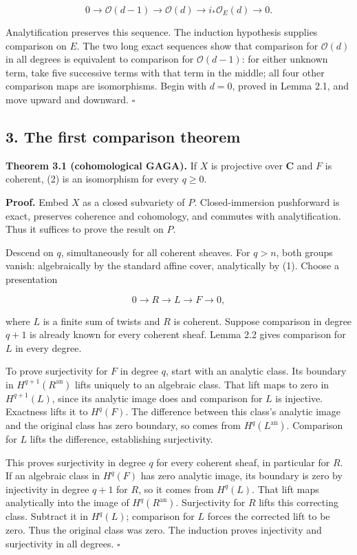 \documentclass[11pt]{article}
\begin{document}
\[
0\to\mathcal O(d-1)\to\mathcal O(d)
\to i_*\mathcal O_E(d)\to0.
\tag{3}
\]

Analytification preserves this sequence. The induction hypothesis
supplies comparison on \(E\). The two long exact sequences show that
comparison for \(\mathcal O(d)\) in all degrees is equivalent to
comparison for \(\mathcal O(d-1)\): for either unknown term, take five
successive terms with that term in the middle; all four other comparison
maps are isomorphisms. Begin with \(d=0\), proved in Lemma 2.1, and move
upward and downward. \(\square\)

\subsection{3. The first comparison
theorem}\label{the-first-comparison-theorem}

\textbf{Theorem 3.1 (cohomological GAGA).} If \(X\) is projective over
\(\mathbf C\) and \(F\) is coherent, (2) is an isomorphism for every
\(q\geq0\).

\textbf{Proof.} Embed \(X\) as a closed subvariety of \(P\).
Closed-immersion pushforward is exact, preserves coherence and
cohomology, and commutes with analytification. Thus it suffices to prove
the result on \(P\).

Descend on \(q\), simultaneously for all coherent sheaves. For \(q>n\),
both groups vanish: algebraically by the standard affine cover,
analytically by (1). Choose a presentation

\[
0\to R\to L\to F\to0,
\tag{4}
\]

where \(L\) is a finite sum of twists and \(R\) is coherent. Suppose
comparison in degree \(q+1\) is already known for every coherent sheaf.
Lemma 2.2 gives comparison for \(L\) in every degree.

To prove surjectivity for \(F\) in degree \(q\), start with an analytic
class. Its boundary in \(H^{q+1}(R^{\mathrm{an}})\) lifts uniquely to an
algebraic class. That lift maps to zero in \(H^{q+1}(L)\), since its
analytic image does and comparison for \(L\) is injective. Exactness
lifts it to \(H^q(F)\). The difference between this class's analytic
image and the original class has zero boundary, so comes from
\(H^q(L^{\mathrm{an}})\). Comparison for \(L\) lifts the difference,
establishing surjectivity.

This proves surjectivity in degree \(q\) for every coherent sheaf, in
particular for \(R\). If an algebraic class in \(H^q(F)\) has zero
analytic image, its boundary is zero by injectivity in degree \(q+1\)
for \(R\), so it comes from \(H^q(L)\). That lift maps analytically into
the image of \(H^q(R^{\mathrm{an}})\). Surjectivity for \(R\) lifts this
correcting class. Subtract it in \(H^q(L)\); comparison for \(L\) forces
the corrected lift to be zero. Thus the original class was zero. The
induction proves injectivity and surjectivity in all degrees.
\(\square\)
\end{document}
